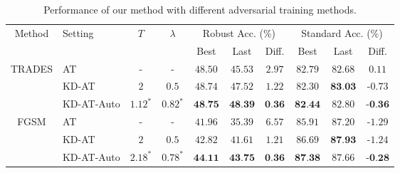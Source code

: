 \begin{table}[!ht]
  \small
  \caption{Performance of our method with different adversarial training methods. 
   }
  \vspace{0.5ex}
  \label{table:result-method}
  \centering
  \small
  \begin{tabular}{clcccccccc}
    \toprule
    \multirow{2}{*}{Method} & \multirow{2}{*}{Setting} & \multirow{2}{*}{$T$} & \multirow{2}{*}{$\lambda$} & \multicolumn{3}{c}{Robust Acc. (\%)} & \multicolumn{3}{c}{Standard Acc. (\%)}\\
     & & &  & Best & Last & Diff. & Best & Last & Diff.\\
    \midrule
\multirow{3}{*}{TRADES} 
& AT & - & - &  $48.50$ & $45.53$ & $ 2.97$ &  $82.79$ &  $82.68$ & $ 0.11$ \\ 
& KD-AT & $2$ & $0.5$ &  $48.74$ & $47.52$ & $ 1.22$ &  $82.30$ &  $\textbf{83.03}$ & -$0.73$ \\ 
& KD-AT-Auto & $1.12^*$ & $0.82^*$ &  $\textbf{48.75}$ & $\textbf{48.39}$ & $ \textbf{0.36}$ &  $\textbf{82.44}$ &  $82.80$ & $\textbf{-0.36}$ \\ 
    \midrule
\multirow{3}{*}{FGSM}
& AT & - & - &  $41.96$ & $35.39$ & $ 6.57$ &  $85.91$ &  $87.20$ & -$1.29$ \\ 
& KD-AT & $2$ & $0.5$ &  $42.82$ & $41.61$ & $ 1.21$ &  $86.69$ &  $\textbf{87.93}$ & -$1.24$ \\ 
& KD-AT-Auto & $2.18^*$ & $0.78^*$ &  $\textbf{44.11}$ & $\textbf{43.75}$ & $ \textbf{0.36}$ &  $\textbf{87.38}$ &  $87.66$ & $\textbf{-0.28}$ \\ 

    \bottomrule
  \end{tabular}
\end{table}




